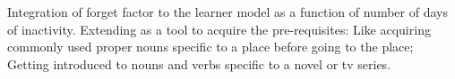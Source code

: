 \documentclass[11pt,a4paper]{article}
\begin{document}
Integration of forget factor to the learner model as a function of number of days of inactivity.
Extending as a tool to acquire the pre-requisites: Like acquiring commonly used proper nouns specific to a place before going to the place; Getting introduced to nouns and verbs specific to a novel or tv series.




\end{document}
